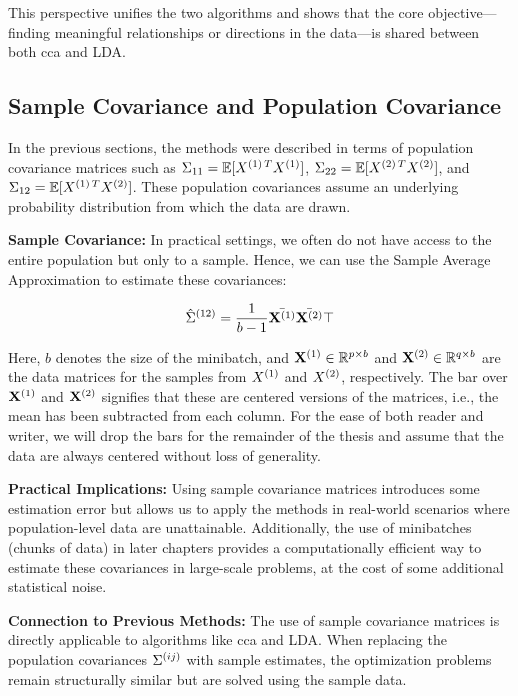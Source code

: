 This perspective unifies the two algorithms and shows that the core objective—finding meaningful relationships or directions in the data—is shared between both \acrshort{cca} and LDA.

\subsection{Sample Covariance and Population Covariance}
In the previous sections, the methods were described in terms of population covariance matrices such as \(\Sigma_{11}=\mathbb{E}[X^{(1)\,T} X^{(1)}]\), \(\Sigma_{22}=\mathbb{E}[X^{(2)\,T} X^{(2)}]\), and \(\Sigma_{12}=\mathbb{E}[X^{(1)\,T} X^{(2)}]\).
These population covariances assume an underlying probability distribution from which the data are drawn.

\textbf{Sample Covariance:} In practical settings, we often do not have access to the entire population but only to a sample. Hence, we can use the Sample Average Approximation to estimate these covariances:

\[
    \hat{\Sigma}^{(12)} = \frac{1}{b-1} \bar{\mathbf{X}^{(1)}} \bar{\mathbf{X}^{(2)}}\top
\]

Here, \(b\) denotes the size of the minibatch, and \(\mathbf{X}^{(1)} \in \mathbb{R}^{p \times b}\) and \(\mathbf{X}^{(2)} \in \mathbb{R}^{q \times b}\) are the data matrices for the samples from \(X^{(1)}\) and \(X^{(2)}\), respectively. The bar over \(\mathbf{X}^{(1)}\) and \(\mathbf{X}^{(2)}\) signifies that these are centered versions of the matrices, i.e., the mean has been subtracted from each column.
For the ease of both reader and writer, we will drop the bars for the remainder of the thesis and assume that the data are always centered without loss of generality.

\textbf{Practical Implications:} Using sample covariance matrices introduces some estimation error but allows us to apply the methods in real-world scenarios where population-level data are unattainable.
Additionally, the use of minibatches (chunks of data) in later chapters provides a computationally efficient way to estimate these covariances in large-scale problems, at the cost of some additional statistical noise.

\textbf{Connection to Previous Methods:} The use of sample covariance matrices is directly applicable to algorithms like \acrshort{cca} and LDA. When replacing the population covariances \(\Sigma^{(ij)}\) with sample estimates, the optimization problems remain structurally similar but are solved using the sample data.

